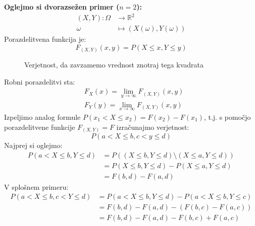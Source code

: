 \documentclass[12pt]{book}
\def\n{\noindent}
\theoremstyle{definition}
\theoremstyle{plain}
\theoremstyle{plain}
\theoremstyle{plain}
\theoremstyle{remark}
\begin{document}
\n \textbf{Oglejmo si dvorazsežen primer ($n=2$):}
$$
\begin{aligned}
    (X, Y): \Omega & \to \mathbb{R}^2 \\
    \omega & \mapsto(X(\omega), Y(\omega))
    \end{aligned}
$$
Porazdelitvena funkcija je: 
$$
F_{(X, Y)}(x, y)=P(X \leq x, Y \leq y)
$$

\begin{figure}[H]
    \centering

    \caption{Verjetnost, da zavzamemo vrednost znotraj tega kvadrata}
    \label{fig:21}
\end{figure}

\n Robni porazdelitvi sta: 
$$
\begin{aligned}
    &F_X(x)=\lim _{y \rightarrow \infty} F_{(X, Y)}{(x, y)} \\
    &F_Y(y)=\lim _{x \rightarrow \infty} F_{(X,Y)}(x, y)
\end{aligned}
$$
Izpeljimo analog formule $P\left(x_1<X \leq x_2\right)=F\left(x_2\right)-F\left(x_1\right)$, t.j. s pomočjo porazdelitvene funkcije $F_{(X, Y)}=F$ izračunajmo verjetnost:
$$
P(a<X \leq b, c<y \leq d)
$$
Najprej si oglejmo:
$$
\begin{aligned}
    P(a<X \leq b, Y \leq d)&=P\left((X \leq b, Y \leq d) \setminus (X \leq a, Y \leq d)\right) \\
    &=P(X \leq b, Y \leq d)-P(X \leq a, Y \leq d) \\
    &=F(b, d)-F(a, d)
\end{aligned}
$$
V splošnem primeru: 
$$
\begin{aligned}
    P(a<X \leq b, c<Y \leq d)&=P(a<X \leq b, Y \leq d) - P(a<X \leq b, Y \leq c) \\
    &=F(b, d)-F(a, d) - (F(b, c)-F(a, c)) \\
    &=F(b, d)-F(a, d)-F(b, c)+F(a, c)
\end{aligned}
$$
\end{document}
